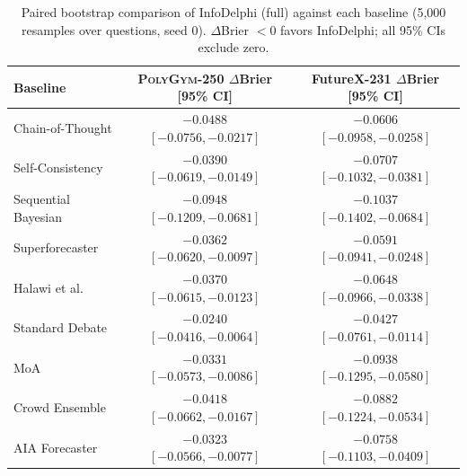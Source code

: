 \begin{table}[t]
\centering
\small
\caption{Paired bootstrap comparison of InfoDelphi (full) against each baseline (5{,}000 resamples over questions, seed 0). $\Delta$Brier $<0$ favors InfoDelphi; all 95\% CIs exclude zero.}
\label{tab:significance}
\begin{tabular}{lcc}
\toprule
Baseline & \textsc{PolyGym}-250 $\Delta$Brier [95\% CI] & FutureX-231 $\Delta$Brier [95\% CI] \\
\midrule
Chain-of-Thought & $-0.0488$ $[-0.0756, -0.0217]$ & $-0.0606$ $[-0.0958, -0.0258]$ \\
Self-Consistency & $-0.0390$ $[-0.0619, -0.0149]$ & $-0.0707$ $[-0.1032, -0.0381]$ \\
Sequential Bayesian & $-0.0948$ $[-0.1209, -0.0681]$ & $-0.1037$ $[-0.1402, -0.0684]$ \\
Superforecaster & $-0.0362$ $[-0.0620, -0.0097]$ & $-0.0591$ $[-0.0941, -0.0248]$ \\
Halawi et al. & $-0.0370$ $[-0.0615, -0.0123]$ & $-0.0648$ $[-0.0966, -0.0338]$ \\
Standard Debate & $-0.0240$ $[-0.0416, -0.0064]$ & $-0.0427$ $[-0.0761, -0.0114]$ \\
MoA & $-0.0331$ $[-0.0573, -0.0086]$ & $-0.0938$ $[-0.1295, -0.0580]$ \\
Crowd Ensemble & $-0.0418$ $[-0.0662, -0.0167]$ & $-0.0882$ $[-0.1224, -0.0534]$ \\
AIA Forecaster & $-0.0323$ $[-0.0566, -0.0077]$ & $-0.0758$ $[-0.1103, -0.0409]$ \\
\bottomrule
\end{tabular}
\end{table}
